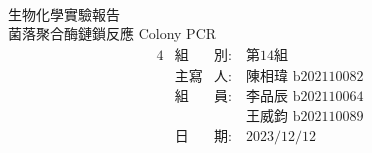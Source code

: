 


\pagestyle{empty}

\begin{center}
~\\
\vspace{2.7cm}
{\fontsize{36}{120}\selectfont 生物化學實驗報告}\\
\vspace{2.2cm}
{\fontsize{36}{80}\selectfont 菌落聚合酶鏈鎖反應 Colony PCR}
\vspace{2cm}
{\fontsize{18}{20}\selectfont 
  \begin{alignat*}{4}
    &\text{組}&\text{別}:\ &\text{第14組}\\
    &\text{主寫}&\text{人}:\ &\text{陳相瑋 b202110082}\\
    &\text{組}&\text{員}:\ &\text{李品辰 b202110064}\\
         &&&\text{王威鈞 b202110089}\\
    &\text{日}&\text{期}:\ &\text{2023/12/12}\\
  \end{alignat*}    
}


\end{center}
\newpage
